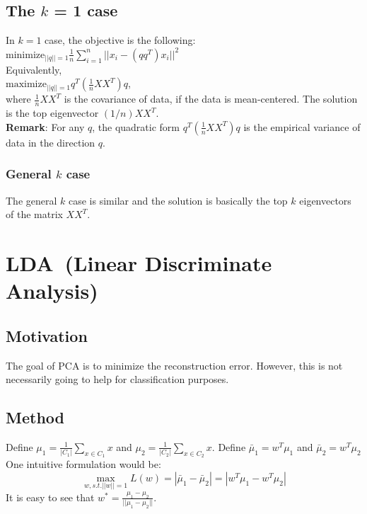 \subsection{The $k$ = 1 case}
In $k=1$ case, the objective is the following:\\

$\textrm{minimize}_{||q||=1} \frac{1}{n} \sum_{i=1}^n
||x_i - (qq^T)x_i||^2$\\

\noindent Equivalently,\\

$\textrm{maximize}_{||q||=1}q^T(\frac{1}{n} XX^T)q$, \\

\noindent where $\frac{1}{n}XX^T$ is the covariance of data, if the
data is mean-centered. The solution is the top eigenvector
$(1/n)XX^T$.\\ 

\noindent \textbf{Remark}: For any $q$, the quadratic form
$q^T(\frac{1}{n}XX^T)q$ is the empirical variance of data in the
direction $q$. 
\subsubsection{General $k$ case}
The general $k$ case is similar and the solution is basically the top
$k$ eigenvectors of the matrix $XX^T$.\\ 

\section{LDA~(Linear Discriminate Analysis)}
\subsection{Motivation}
The goal of PCA is to minimize the reconstruction error. However, this
is not necessarily going to help for classification purposes. 
\subsection{Method}
Define $\mu_1=\frac{1}{|C_1|} \sum_{x\in C_1} x$ and
$\mu_2=\frac{1}{|C_2|} \sum_{x\in C_2} x$. Define $\bar{\mu}_1=w^T
\mu_1$ and $\bar{\mu}_2=w^T \mu_2$\\ 
One intuitive formulation would be:
\[
\max_{w,s.t.||w||=1} L(w) = |\bar{\mu}_1 - \bar{\mu}_2| = |w^T\mu_1 - w^T\mu_2|
\]
It is easy to see that $w^*=\frac{\mu_1 - \mu_2}{||\mu_1-\mu_2||}$.\\

